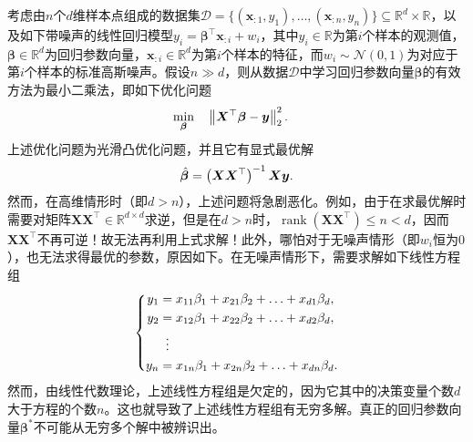 \begin{example}\label{ex:highdim-reg}\kaishu
    考虑由$n$个$d$维样本点组成的数据集$\mathcal{D}=\{(\boldsymbol{x}_{:1},y_{1}),\allowbreak\ldots,\allowbreak(\boldsymbol{x}_{:n},y_{n})\}\subseteq\mathbb{R}^{d}\times\mathbb{R}$，以及如下带噪声的线性回归模型$y_{i}=\bm{\beta}^{\top}\boldsymbol{x}_{:i}+w_{i}$，其中$y_{i}\in\mathbb{R}$为第$i$个样本的观测值，$\bm{\beta}\in\mathbb{R}^{d}$为回归参数向量，$\boldsymbol{x}_{:i}\in\mathbb{R}^{d}$为第$i$个样本的特征，而$w_{i}\sim\mathcal{N}(0,1)$为对应于第$i$个样本的标准高斯噪声。假设$n\gg d$，则从数据$\mathcal{D}$中学习回归参数向量$\bm{\beta}$的有效方法为最小二乘法，即如下优化问题
    \begin{equation*}
        \begin{aligned}
            &\underset{\bm{\beta}}{\min}&& \left\lVert\boldsymbol{X}^{\top}\bm{\beta}-\boldsymbol{y}\right\rVert_{2}^{2}.
        \end{aligned}
    \end{equation*}
    上述优化问题为光滑凸优化问题，并且它有显式最优解
    \begin{equation*}
        \hat{\bm{\beta}}=\left(\boldsymbol{X}\boldsymbol{X}^{\top}\right)^{-1}\boldsymbol{X}\boldsymbol{y}.
    \end{equation*}
    然而，在高维情形时（即$d>n$），上述问题将急剧恶化。例如，由于在求最优解时需要对矩阵$\boldsymbol{X}\boldsymbol{X}^{\top}\in\mathbb{R}^{d\times d}$求逆，但是在$d>n$时，$\operatorname{rank}(\boldsymbol{X}\boldsymbol{X}^{\top})\leq n<d$，因而$\boldsymbol{X}\boldsymbol{X}^{\top}$不再可逆！故无法再利用上式求解！此外，哪怕对于无噪声情形（即$w_{i}$恒为$0$），也无法求得最优的参数，原因如下。在无噪声情形下，需要求解如下线性方程组
    \begin{equation*}
        \left\{
        \begin{aligned}
            y_{1} &= x_{11}\beta_{1}+x_{21}\beta_{2}+\ldots+x_{d1}\beta_{d},\\
            y_{2} &= x_{12}\beta_{1}+x_{22}\beta_{2}+\ldots+x_{d2}\beta_{d},\\
            &\vdotswithin{=}\\
            y_{n} &= x_{1n}\beta_{1}+x_{2n}\beta_{2}+\ldots+x_{dn}\beta_{d}.
        \end{aligned}
        \right.
    \end{equation*}
    然而，由线性代数理论，上述线性方程组是欠定的，因为它其中的决策变量个数$d$大于方程的个数$n$。这也就导致了上述线性方程组有无穷多解。真正的回归参数向量$\bm{\beta}^{*}$不可能从无穷多个解中被辨识出。
\end{example}

